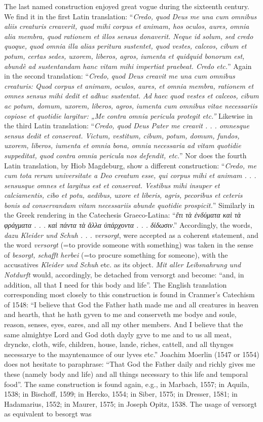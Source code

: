The last named construction enjoyed great vogue during the sixteenth century. We find it in the first Latin translation: “\emph{Credo, quod Deus me una cum omnibus aliis creaturis creaverit, quod mihi corpus et animam, hos oculos, aures, omnia alia membra, quod rationem et illos sensus donaverit. Neque id solum, sed credo quoque, quod omnia illa alias peritura sustentet, quod vestes, calceos, cibum et potum, certas sedes, uxorem, liberos, agros, iumenta et quidquid bonorum est, abundè ad sustentandam hanc vitam mihi impertiat praebeat. Credo etc.}” Again in the second translation: “\emph{Credo, quod Deus creavit me una cum omnibus creaturis: Quod corpus et animam, oculos, aures, et omnia membra, rationem et omnes sensus mihi dedit et adhuc sustentat. Ad haec quod vestes et calceos, cibum ac potum, domum, uxorem, liberos, agros,}
\emph{iumenta cum omnibus vitae necessariis copiose et quotidie largitur: „Me contra omnia pericula protegit etc.”} Likewise in the third Latin translation: “\emph{Credo, quod Deus Pater me creavit . . . omnesque sensus dedit et conservat. Victum, vestitum, cibum, potum, domum, fundos, uxorem, liberos, iumenta et omnia bona, omnia necessaria ad vitam quotidie suppeditat, quod contra omnia pericula nos defendit, etc.}” Nor does the fourth Latin translation, by Hiob Magdeburg, show a different construction: “\emph{Credo, me cum tota rerum universitate a Deo creatum esse, qui corpus mihi et animam . . . sensusque omnes et largitus est et conservat. Vestibus mihi insuper et calciamentis, cibo et potu, aedibus, uxore et liberis, agris, pecoribus et ceteris bonis ad conservandam vitam necessariis abunde quotidie prospicit.}” Similarly in the Greek rendering in the Catechesis Graeco-Latina: “\emph{ἔτι τὰ ἐνδύματα καὶ τὰ φράγματα . . . καὶ πάντα τὰ ἄλλα ὑπάρχοντα . . . δίδωσιν}.” Accordingly, the words, \emph{dazu Kleider und Schuh . . . versorgt}, were accepted as a coherent statement, and the word \emph{versorgt} (=to provide someone with something) was taken in the sense of \emph{besorgt, schafft herbei} (=to procure something for someone), with the accusatives \emph{Kleider und Schuh} etc. as its object. \emph{Mit aller Leibsnahrung und Notdurft} would, accordingly, be detached from versorgt and become: “and, in addition, all that I need for this body and life”. The English translation corresponding most closely to this construction is found in Cranmer’s Catechism of 1548: “I believe that God the Father hath made me and all creatures in heaven and hearth, that he hath gyven to me and conserveth me bodye and soule, reason, senses, eyes, eares, and all my other members. And I believe that the same almightye Lord and God doth dayly gyve to me and to us all meat, dryncke, cloth, wife, children, house, lande, riches, cattell, and all thynges necessarye to the mayntenaunce of our lyves etc.” Joachim Moerlin (1547 or 1554) does not hesitate to paraphrase: “That God the Father daily and richly gives me these (namely body and life) and all things necessary to this life and temporal food”. The same construction is found again, e.g., in Marbach, 1557; in Aquila, 1538; in Bischoff, 1599; in Hercko, 1554; in Siber, 1575; in Dresser, 1581; in Hadamarius, 1552; in Maurer, 1575; in Joseph Opitz, 1538. The usage of versorgt as equivalent to besorgt was 